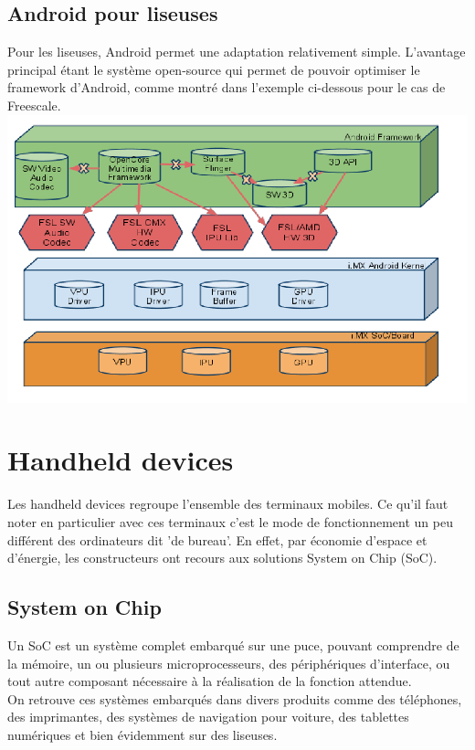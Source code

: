 \subsection{Android pour liseuses}
Pour les liseuses, Android permet une adaptation relativement simple. L'avantage principal étant le système open-source qui permet de pouvoir optimiser le framework d'Android, comme montré dans l'exemple ci-dessous pour le cas de Freescale.\\
\includegraphics[scale=0.45]{Android.png}

\newpage

\section{Handheld devices}
Les handheld devices regroupe l'ensemble des terminaux mobiles. Ce qu'il faut noter en particulier avec ces terminaux c'est le mode de fonctionnement un peu différent des ordinateurs dit 'de bureau'. En effet, par économie d'espace et d'énergie, les constructeurs ont recours aux solutions System on Chip (SoC).

\subsection{System on Chip}
Un SoC est un système complet embarqué sur une puce, pouvant comprendre de la mémoire, un ou plusieurs microprocesseurs, des périphériques d'interface, ou tout autre composant nécessaire à la réalisation de la fonction attendue.
\\On retrouve ces systèmes embarqués dans divers produits comme des téléphones, des imprimantes, des systèmes de navigation pour voiture, des tablettes numériques et bien évidemment sur des liseuses.